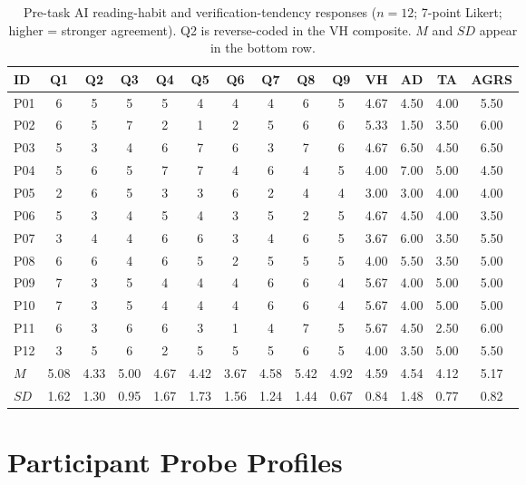 \documentclass[manuscript,review,anonymous]{acmart}
\begin{document}
\begin{table}[t]
\centering
\caption{Pre-task AI reading-habit and verification-tendency responses ($n=12$; 7-point Likert; higher = stronger agreement). Q2 is reverse-coded in the VH composite. $M$ and $SD$ appear in the bottom row.}
\label{tab:pretest_responses}
\small
\setlength{\tabcolsep}{3pt}
\begin{tabular}{lccccccccc|cccc}
\toprule
\textbf{ID} & \textbf{Q1} & \textbf{Q2} & \textbf{Q3} & \textbf{Q4} & \textbf{Q5} & \textbf{Q6} & \textbf{Q7} & \textbf{Q8} & \textbf{Q9} & \textbf{VH} & \textbf{AD} & \textbf{TA} & \textbf{AGRS} \\
\midrule
P01 & 6 & 5 & 5 & 5 & 4 & 4 & 4 & 6 & 5 & 4.67 & 4.50 & 4.00 & 5.50 \\
P02 & 6 & 5 & 7 & 2 & 1 & 2 & 5 & 6 & 6 & 5.33 & 1.50 & 3.50 & 6.00 \\
P03 & 5 & 3 & 4 & 6 & 7 & 6 & 3 & 7 & 6 & 4.67 & 6.50 & 4.50 & 6.50 \\
P04 & 5 & 6 & 5 & 7 & 7 & 4 & 6 & 4 & 5 & 4.00 & 7.00 & 5.00 & 4.50 \\
P05 & 2 & 6 & 5 & 3 & 3 & 6 & 2 & 4 & 4 & 3.00 & 3.00 & 4.00 & 4.00 \\
P06 & 5 & 3 & 4 & 5 & 4 & 3 & 5 & 2 & 5 & 4.67 & 4.50 & 4.00 & 3.50 \\
P07 & 3 & 4 & 4 & 6 & 6 & 3 & 4 & 6 & 5 & 3.67 & 6.00 & 3.50 & 5.50 \\
P08 & 6 & 6 & 4 & 6 & 5 & 2 & 5 & 5 & 5 & 4.00 & 5.50 & 3.50 & 5.00 \\
P09 & 7 & 3 & 5 & 4 & 4 & 4 & 6 & 6 & 4 & 5.67 & 4.00 & 5.00 & 5.00 \\
P10 & 7 & 3 & 5 & 4 & 4 & 4 & 6 & 6 & 4 & 5.67 & 4.00 & 5.00 & 5.00 \\
P11 & 6 & 3 & 6 & 6 & 3 & 1 & 4 & 7 & 5 & 5.67 & 4.50 & 2.50 & 6.00 \\
P12 & 3 & 5 & 6 & 2 & 5 & 5 & 5 & 6 & 5 & 4.00 & 3.50 & 5.00 & 5.50 \\
\midrule
$M$ & 5.08 & 4.33 & 5.00 & 4.67 & 4.42 & 3.67 & 4.58 & 5.42 & 4.92 & 4.59 & 4.54 & 4.12 & 5.17 \\
$SD$ & 1.62 & 1.30 & 0.95 & 1.67 & 1.73 & 1.56 & 1.24 & 1.44 & 0.67 & 0.84 & 1.48 & 0.77 & 0.82 \\
\bottomrule
\end{tabular}
\end{table}

\section{Participant Probe Profiles}
\label{appendix:probe-profiles}
\end{document}
